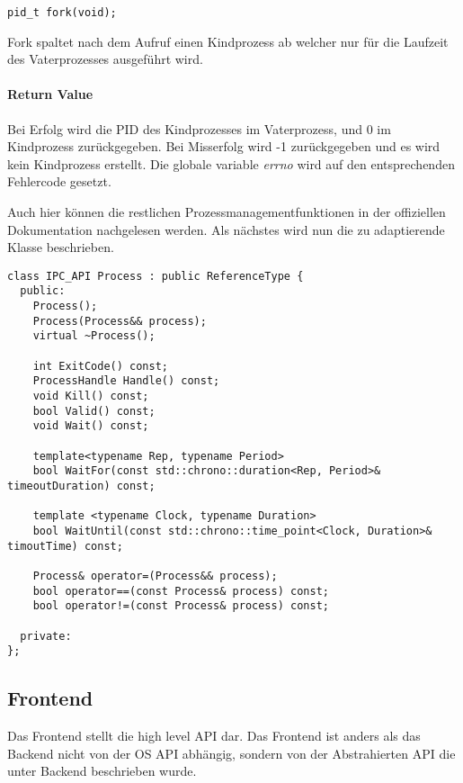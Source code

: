 \documentclass[a4paper]{book}
\begin{document}
\lstset{language=[GNU]C++}
\begin{lstlisting}[caption={fork},frame=single]
pid_t fork(void);
\end{lstlisting}
Fork spaltet nach dem Aufruf einen Kindprozess ab welcher nur für die Laufzeit des Vaterprozesses
ausgeführt wird. 
\paragraph{Return Value}
	Bei Erfolg wird die PID des Kindprozesses im Vaterprozess, und 0 im Kindprozess zurückgegeben.
	Bei Misserfolg wird -1 zurückgegeben und es wird kein Kindprozess erstellt. Die globale variable
	\textit{errno} wird auf den entsprechenden Fehlercode gesetzt.

\noindent Auch hier können die restlichen Prozessmanagementfunktionen in der offiziellen Dokumentation nachgelesen werden. Als nächstes wird nun die zu adaptierende Klasse beschrieben.

\lstset{language=C++,breaklines=true}
\begin{lstlisting}[caption={class Process},frame=single]
class IPC_API Process : public ReferenceType {
  public:
    Process();
    Process(Process&& process);
    virtual ~Process();
    
    int ExitCode() const;
    ProcessHandle Handle() const;
    void Kill() const;
    bool Valid() const;
    void Wait() const;
    
    template<typename Rep, typename Period>
    bool WaitFor(const std::chrono::duration<Rep, Period>& timeoutDuration) const;
    
    template <typename Clock, typename Duration>
    bool WaitUntil(const std::chrono::time_point<Clock, Duration>& timoutTime) const;
    
    Process& operator=(Process&& process);
    bool operator==(const Process& process) const;
    bool operator!=(const Process& process) const;
    
  private:
};
\end{lstlisting}

\subsection{Frontend}
Das Frontend stellt die high level API dar. Das Frontend ist anders als das Backend nicht von der OS API abhängig, sondern von der Abstrahierten API die unter Backend beschrieben wurde.\newline
\end{document}
